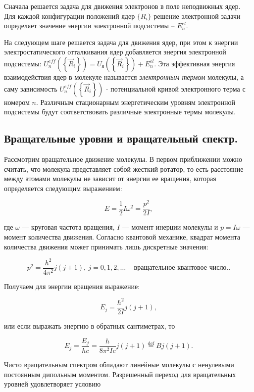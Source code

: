 \documentclass[11.5pt,a4paper,russian]{article}
\begin{document}
Сначала решается задача для движения электронов в поле неподвижных ядер. Для каждой конфигурации положений ядер $\{ R_i \}$ решение электронной задачи определяет значение энергии электронной подсистемы – $E_n^{el}$.

На следующем шаге решается задача для движения ядер, при этом к энергии электростатического отталкивания ядер добавляется энергия электронной подсистемы: $U_n^{e f f}\left(\left\{\vec{R}_i\right\}\right)=U_\text{я}\left(\left\{\vec{R}_i\right\}\right)+E_n^{e l}$. Эта эффективная энергия взаимодействия ядер в молекуле называется \textit{электронным термом} молекулы, а саму зависимость $U_n^{e f f}\left(\left\{\vec{R}_i\right\}\right)$ - потенциальной кривой электронного терма с номером $n$. Различным стационарным энергетическим уровням электронной подсистемы будут соответствовать различные электронные термы молекулы.

\subsection{Вращательные уровни и вращательный спектр.}
Рассмотрим вращательное движение молекулы. В первом приближении можно считать, что молекула представляет собой жесткий ротатор, то есть расстояние между атомами молекулы не зависит от энергии ее вращения, которая определяется следующим выражением:

$$
E = \dfrac{1}{2}I\omega^2 = \dfrac{p^2}{2I},
$$

где $\omega$ — круговая частота вращения, $I$ — момент инерции молекулы и $p = I\omega$ — момент количества движения. Согласно квантовой механике, квадрат момента количества движения может принимать лишь дискретные значения:

\[p^2 = \dfrac{h^2}{4\pi^2} j(j+1),~j=0,1,2,\dots\text{ -- вращательное квантовое число.}.\]

Получаем для энергии вращения выражение:

\[E_j = \dfrac{\hbar^2}{2I}j(j+1),\]

или если выражать энергию в обратных сантиметрах, то

\begin{equation}
E_j = \dfrac{E_j}{hc} = \dfrac{h}{8\pi^2Ic}j(j+1) \stackrel{\mathrm{def}}{=} B j (j+1).
\label{1}
\end{equation}

Чисто вращательным спектром обладают линейные молекулы с ненулевыми постоянным дипольным моментом. Разрешенный переход для вращательных уровней удовлетворяет условию
\end{document}
